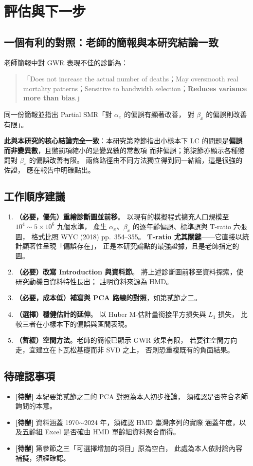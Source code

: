 \documentclass[UTF8, fontset=macnew, a4paper, 12pt]{ctexart}
\newcommand{\todo}[1]{\textcolor{red!70!black}{\textbf{[待辦] }#1}}
\begin{document}
\section{評估與下一步}

\subsection{一個有利的對照：老師的簡報與本研究結論一致}

老師簡報中對 GWR 表現不佳的診斷為：

\begin{quote}\small
「Does not increase the actual number of deaths；May oversmooth real mortality
patterns；Sensitive to bandwidth selection；\textbf{Reduces variance more than
bias}.」
\end{quote}

\noindent 同一份簡報並指出 Partial SMR「對 $\alpha_x$ 的偏誤有顯著改善，
對 $\beta_x$ 的偏誤則改善有限」。

\noindent\textbf{此與本研究的核心結論完全一致}：本研究第陸節指出小樣本下
LC 的問題是\textbf{偏誤而非變異數}，且懲罰項縮小的是變異數的常數項
而非偏誤；第柒節亦顯示各種懲罰對 $\beta_x$ 的偏誤改善有限。
兩條路徑由不同方法獨立得到同一結論，這是很強的佐證，
應在報告中明確點出。

\subsection{工作順序建議}

\begin{enumerate}[leftmargin=*]
  \item \textbf{（必要，優先）重繪診斷圖並前移}。
        以現有的模擬程式擴充人口規模至 $10^4\sim5\times10^6$ 九個水準，
        產生 $\alpha_x$、$\beta_x$ 的逐年齡偏誤、標準誤與 T-ratio 六張圖，
        格式比照 WYC (2018) pp.~354--355。
        \textbf{T-ratio 尤其關鍵}——它直接以統計顯著性呈現「偏誤存在」，
        正是本研究論點的最強證據，且是老師指定的圖。
  \item \textbf{（必要）改寫 Introduction 與資料節}。
        將上述診斷圖前移至資料探索，使研究動機自資料特性長出；
        註明資料來源為 HMD。
  \item \textbf{（必要，成本低）補寫與 PCA 路線的對照}，如第貳節之二。
  \item \textbf{（選擇）穩健估計的延伸}。
        以 Huber M-估計量銜接平方損失與 $L_1$ 損失，
        比較三者在小樣本下的偏誤與區間表現。
  \item \textbf{（暫緩）空間方法}。老師的簡報已顯示 GWR 效果有限，
        若要往空間方向走，宜建立在卜瓦松基礎而非 SVD 之上，
        否則恐重複既有的負面結果。
\end{enumerate}

\subsection{待確認事項}

\begin{itemize}
  \item \todo{本紀要第貳節之二的 PCA 對照為本人初步推論，
        須確認是否符合老師詢問的本意。}
  \item \todo{資料涵蓋 1970$\sim$2024 年，須確認 HMD 臺灣序列的實際
        涵蓋年度，以及五齡組 Excel 是否確由 HMD 單齡組資料聚合而得。}
  \item \todo{第參節之三「可選擇增加的項目」原為空白，
        此處為本人依討論內容補擬，須經確認。}
\end{itemize}
\end{document}
